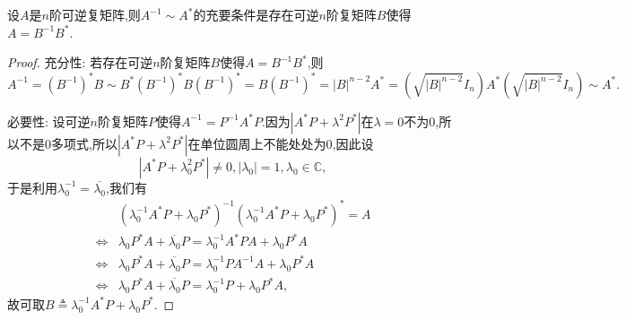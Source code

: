 \documentclass[../../main.tex]{subfiles}%
\begin{document}
\begin{theorem}[]\label{theorem:}
设\( A \)是\( n \)阶可逆复矩阵,则\( A^{-1} \sim A^* \)的充要条件是存在可逆\( n \)阶复矩阵\( B \)使得\( A = B^{-1} B^* \).
\end{theorem}
\begin{proof}

{\heiti 充分性:} 若存在可逆\( n \)阶复矩阵\( B \)使得\( A = B^{-1} B^* \),则
\[
A^{-1}=(B^{-1})^*B\sim B^*(B^{-1})^*B(B^{-1})^*=B(B^{-1})^*=\left| B \right|^{n-2}A^*=\left( \sqrt{\left| B \right|^{n-2}}I_n \right) A^*\left( \sqrt{\left| B \right|^{n-2}}I_n \right) \sim A^*.
\]

{\heiti 必要性:} 设可逆\( n \)阶复矩阵\( P \)使得\( A^{-1} = P^{-1} A^* P \).因为\( |A^* P + \lambda^2 P^*| \)在\( \lambda = 0 \)不为0,所以不是0多项式,所以\( |A^* P + \lambda^2 P^*| \)在单位圆周上不能处处为0,因此设
\[
|A^* P + \lambda_0^2 P^*| \neq 0, |\lambda_0| = 1, \lambda_0 \in \mathbb{C},
\]
于是利用\( \lambda_0^{-1} = \overline{\lambda_0} \),我们有
\[
\begin{aligned}
& (\lambda_0^{-1} A^* P + \lambda_0 P^*)^{-1} (\lambda_0^{-1} A^* P + \lambda_0 P^*)^* = A \\
\iff  & \lambda_0 P^* A + \overline{\lambda_0} P = \lambda_0^{-1} A^* P A + \lambda_0 P^* A \\
\iff  & \lambda_0 P^* A + \overline{\lambda_0} P = \lambda_0^{-1} P A^{-1} A + \lambda_0 P^* A \\
\iff  & \lambda_0 P^* A + \overline{\lambda_0} P = \lambda_0^{-1} P + \lambda_0 P^* A,
\end{aligned}
\]
故可取\( B \triangleq \lambda_0^{-1} A^* P + \lambda_0 P^* \).
\end{proof}
\end{document}
